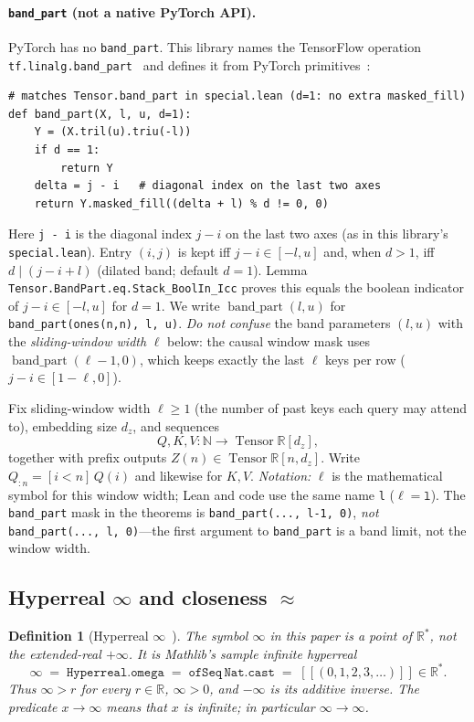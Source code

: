 \documentclass[11pt,a4paper]{article}
\newtheorem{definition}[theorem]{Definition}
\newcommand{\Tensor}{\operatorname{Tensor}}
\newcommand{\bandpart}{\operatorname{band\_part}}
\newcommand{\XEq}{\approx}
\newcommand{\Rstar}{\mathbb{R}^*}
\begin{document}
\paragraph{\texttt{band\_part} (not a native PyTorch API).}
PyTorch has no \texttt{band\_part}.
This library names the TensorFlow operation \texttt{tf.linalg.band\_part}~\cite{tensorflow_band_part} and defines it from PyTorch primitives~\cite{lemma_repo}:
\begin{verbatim}
# matches Tensor.band_part in special.lean (d=1: no extra masked_fill)
def band_part(X, l, u, d=1):
    Y = (X.tril(u).triu(-l))
    if d == 1:
        return Y
    delta = j - i   # diagonal index on the last two axes
    return Y.masked_fill((delta + l) % d != 0, 0)
\end{verbatim}
\noindent
Here \texttt{j - i} is the diagonal index $j-i$ on the last two axes (as in this library's \texttt{special.lean}).
Entry $(i,j)$ is kept iff $j-i\in[-l,u]$ and, when $d>1$, iff $d\mid(j-i+l)$ (dilated band; default $d=1$).
Lemma \texttt{Tensor.BandPart.eq.Stack\_BoolIn\_Icc} proves this equals the boolean indicator of $j-i\in[-l,u]$ for $d=1$.
We write $\bandpart(l,u)$ for \texttt{band\_part(ones(n,n), l, u)}.
\emph{Do not confuse} the band parameters $(l,u)$ with the \emph{sliding-window width} $\ell$ below: the causal window mask uses $\bandpart(\ell-1,0)$, which keeps exactly the last $\ell$ keys per row ($j-i\in[1-\ell,0]$).

Fix sliding-window width $\ell\ge 1$ (the number of past keys each query may attend to), embedding size $d_z$, and sequences
\[
Q,K,V:\mathbb{N}\to\Tensor\mathbb{R}[d_z],
\]
together with prefix outputs $Z(n)\in\Tensor\mathbb{R}[n,d_z]$.
Write $Q_{:n}=[i<n]\,Q(i)$ and likewise for $K,V$.
\emph{Notation:} $\ell$ is the mathematical symbol for this window width; Lean and code use the same name \texttt{l} ($\ell=\texttt{l}$).
The \texttt{band\_part} mask in the theorems is \texttt{band\_part(..., l-1, 0)}, \emph{not} \texttt{band\_part(..., l, 0)}---the first argument to \texttt{band\_part} is a band limit, not the window width.

\subsection{Hyperreal \texorpdfstring{$\infty$}{infinity} and closeness \texorpdfstring{$\XEq$}{approx}}

\begin{definition}[Hyperreal $\infty$~\cite{mathlib_hyperreal}]
\label{def:infty}
The symbol $\infty$ in this paper is a point of $\Rstar$, not the extended-real $+\infty$.
It is Mathlib's sample infinite hyperreal
\[
\infty \;=\; \mathtt{Hyperreal.omega}
\;=\; \mathtt{ofSeq}\,\mathtt{Nat.cast}
\;=\; [\![(0,1,2,3,\ldots)]\!]
\in\Rstar.
\]
Thus $\infty>r$ for every $r\in\mathbb{R}$, $\infty>0$, and $-\infty$ is its additive inverse.
The predicate $x\to\infty$ means that $x$ is infinite; in particular $\infty\to\infty$.
\end{definition}
\end{document}
